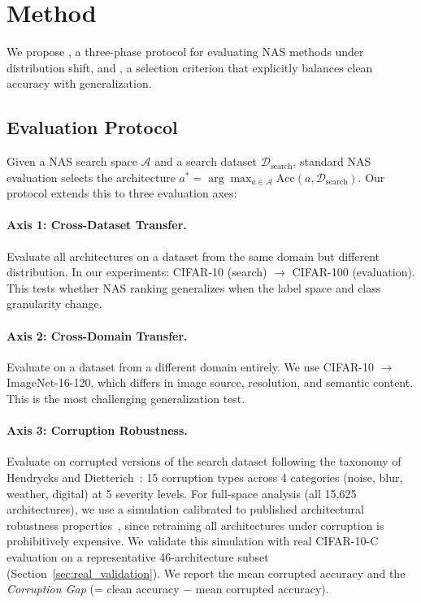 \section{Method}
\label{sec:method}

We propose \method, a three-phase protocol for evaluating NAS methods under distribution shift, and \sasc, a selection criterion that explicitly balances clean accuracy with generalization.

\subsection{Evaluation Protocol}
\label{sec:protocol}

Given a NAS search space $\mathcal{A}$ and a search dataset $\mathcal{D}_\text{search}$, standard NAS evaluation selects the architecture $a^* = \arg\max_{a \in \mathcal{A}} \text{Acc}(a, \mathcal{D}_\text{search})$. Our protocol extends this to three evaluation axes:

\paragraph{Axis 1: Cross-Dataset Transfer.}
Evaluate all architectures on a dataset from the same domain but different distribution. In our experiments: CIFAR-10 (search) $\to$ CIFAR-100 (evaluation). This tests whether NAS ranking generalizes when the label space and class granularity change.

\paragraph{Axis 2: Cross-Domain Transfer.}
Evaluate on a dataset from a different domain entirely. We use CIFAR-10 $\to$ ImageNet-16-120, which differs in image source, resolution, and semantic content. This is the most challenging generalization test.

\paragraph{Axis 3: Corruption Robustness.}
Evaluate on corrupted versions of the search dataset following the taxonomy of Hendrycks and Dietterich~\cite{hendrycks2019benchmarking}: 15 corruption types across 4 categories (noise, blur, weather, digital) at 5 severity levels.
For full-space analysis (all 15,625 architectures), we use a simulation calibrated to published architectural robustness properties~\cite{guo2020robnet}, since retraining all architectures under corruption is prohibitively expensive.
We validate this simulation with real CIFAR-10-C evaluation on a representative 46-architecture subset (Section~\ref{sec:real_validation}).
We report the mean corrupted accuracy and the \emph{Corruption Gap} (\cg = clean accuracy $-$ mean corrupted accuracy).

